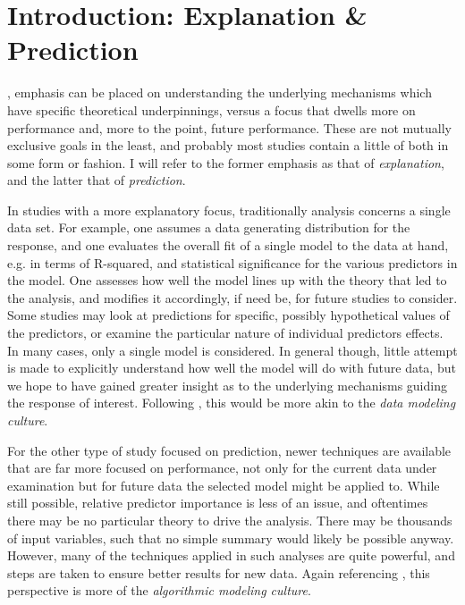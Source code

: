 \documentclass[english,nohyper,titlepage]{tufte-handout}\usepackage{knitr}
\begin{document}
\pagebreak{}






\part{Introduction: Explanation \& Prediction}
, emphasis can be placed on understanding the underlying mechanisms which have specific theoretical underpinnings, versus a focus that dwells more on performance and, more to the point, future performance.  These are not mutually exclusive goals in the least, and probably most studies contain a little of both in some form or fashion.  I will refer to the former emphasis as that of \emph{explanation}, and the latter that of \emph{prediction}.

In studies with a more explanatory focus, traditionally analysis concerns a single data set.  For example, one assumes a data generating distribution for the response, and one evaluates the overall fit of a single model to the data at hand, e.g. in terms of R-squared, and statistical significance for the various predictors in the model.  One assesses how well the model lines up with the theory that led to the analysis, and modifies it accordingly, if need be, for future studies to consider.  Some studies may look at  predictions for specific, possibly hypothetical values of the predictors, or examine the particular nature of individual predictors effects.  In many cases, only a single model is considered.  In general though, little attempt is made to explicitly understand how well the model will do with future data, but we hope to have gained greater insight as to the underlying mechanisms guiding the response of interest.  Following \citet{breiman_statistical_2001}, this would be more akin to the \emph{data modeling culture}.

For the other type of study focused on prediction, newer techniques are available that are far more focused on performance, not only for the current data under examination but for future data the selected model might be applied to.  While still possible, relative predictor importance is less of an issue, and oftentimes there may be no particular theory to drive the analysis.  There may be thousands of input variables, such that no simple summary would likely be possible anyway.  However, many of the techniques applied in such analyses are quite powerful, and steps are taken to ensure better results for new data.  Again referencing \citet*{breiman_statistical_2001}, this perspective is more of the \emph{algorithmic modeling culture}.
\end{document}
